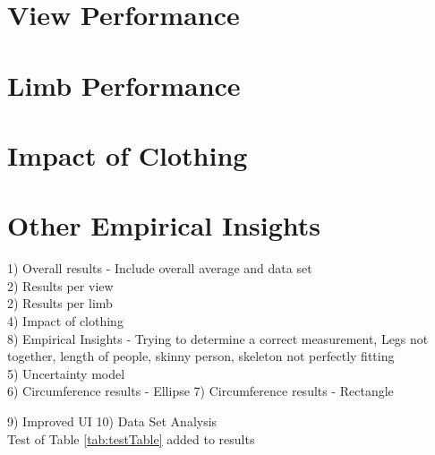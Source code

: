 \section{View Performance}


\section{Limb Performance}


\section{Impact of Clothing}


\section{Other Empirical Insights}


1) Overall results - Include overall average and data set\\

2) Results per view\\

2) Results per limb\\

4) Impact of clothing\\

8) Empirical Insights - Trying to determine a correct measurement, Legs not together, length of people, skinny person, skeleton not perfectly fitting \\

5) Uncertainty model\\

6) Circumference results - Ellipse
7) Circumference results - Rectangle


9) Improved UI
10) Data Set Analysis\\

Test of Table \ref{tab:testTable} added to results

